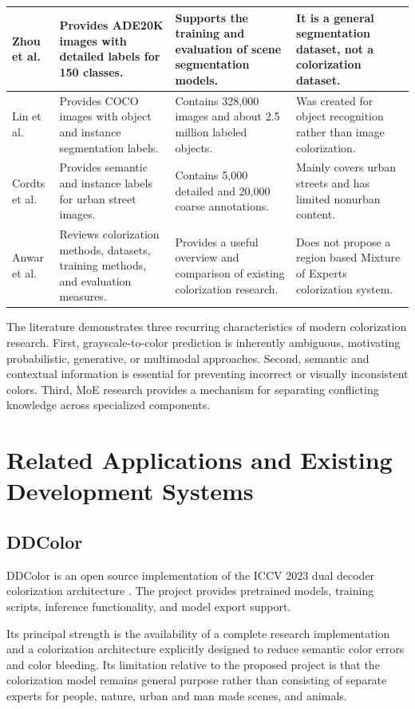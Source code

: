 \documentclass{FastFyp}
\begin{document}
\begin{longtable}{|p{2.5cm}|p{4.2cm}|p{4.2cm}|p{3.8cm}|}
\hline
Zhou et al. \cite{ref18} & Provides ADE20K images with detailed labels for 150 classes. & Supports the training and evaluation of scene segmentation models. & It is a general segmentation dataset, not a colorization dataset. \\
\hline
Lin et al. \cite{ref19} & Provides COCO images with object and instance segmentation labels. & Contains 328,000 images and about 2.5 million labeled objects. & Was created for object recognition rather than image colorization. \\
\hline
Cordts et al. \cite{ref20} & Provides semantic and instance labels for urban street images. & Contains 5,000 detailed and 20,000 coarse annotations. & Mainly covers urban streets and has limited nonurban content. \\
\hline
Anwar et al. \cite{ref21} & Reviews colorization methods, datasets, training methods, and evaluation measures. & Provides a useful overview and comparison of existing colorization research. & Does not propose a region based Mixture of Experts colorization system. \\
\hline
\end{longtable}


The literature demonstrates three recurring characteristics of modern colorization research. First, grayscale-to-color prediction is inherently ambiguous, motivating probabilistic, generative, or multimodal approaches. Second, semantic and contextual information is essential for preventing incorrect or visually inconsistent colors. Third, MoE research provides a mechanism for separating conflicting knowledge across specialized components.

\section{Related Applications and Existing Development Systems}

\subsection{DDColor}

DDColor is an open source implementation of the ICCV 2023 dual decoder colorization architecture \cite{ref9,ref10}. The project provides pretrained models, training scripts, inference functionality, and model export support.

Its principal strength is the availability of a complete research implementation and a colorization architecture explicitly designed to reduce semantic color errors and color bleeding. Its limitation relative to the proposed project is that the colorization model remains general purpose rather than consisting of separate experts for people, nature, urban and man made scenes, and animals.
\end{document}
